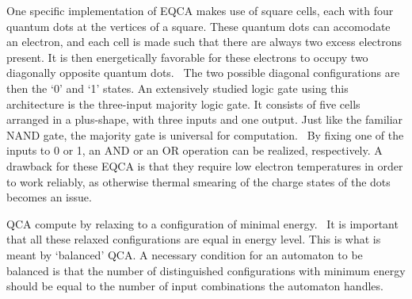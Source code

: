 \documentclass[12pt,a4paper]{article}
\begin{document}
One specific implementation of EQCA makes use of square cells, each with four quantum dots at the vertices of a square. These quantum dots can accomodate an electron, and each cell is made such that there are always two excess electrons present. It is then energetically favorable for these electrons to occupy two diagonally opposite quantum dots.~\cite{QCA_DigitalLogicGate} The two possible diagonal configurations are then the `0' and `1' states. An extensively studied logic gate using this architecture is the three-input majority logic gate. It consists of five cells arranged in a plus-shape, with three inputs and one output. Just like the familiar NAND gate, the majority gate is universal for computation.~\cite{NML_Carlton} By fixing one of the inputs to 0 or 1, an AND or an OR operation can be realized, respectively. A drawback for these EQCA is that they require low electron temperatures in order to work reliably, as otherwise thermal smearing of the charge states of the dots becomes an issue.~\cite{QCA_DigitalLogicGate} \par
QCA compute by relaxing to a configuration of minimal energy.~\cite{QCA_Algorithms} It is important that all these relaxed configurations are equal in energy level. This is what is meant by `balanced' QCA. A necessary condition for an automaton to be balanced is that the number of distinguished configurations with minimum energy should be equal to the number of input combinations the automaton handles.~\cite{QCA_Algorithms}
\end{document}
